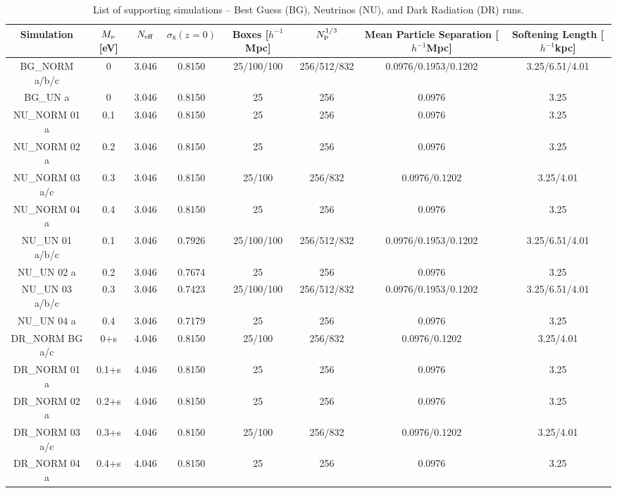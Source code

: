 \documentclass{emulateapj}
\begin{document}
\begin{table*}
\begin{center}
\tiny
\centering
\caption{List of supporting simulations -- Best Guess (BG), Neutrinos (NU), and Dark Radiation (DR) runs.}
\doublerulesep 2.0pt
\renewcommand\arraystretch{1.5}
\begin{tabular}{cccccccc} 
\hline \hline
 Simulation &   $M_{\rm \nu}$ [eV]  &   $N_{\rm eff}$ & $\sigma_8(z=0)$  & Boxes [$h^{-1}$Mpc] & $N_{\rm p}^{1/3}$ & Mean Particle Separation  [$h^{-1}$Mpc] & { Softening Length [$h^{-1}$kpc]}  \\ 
\hline
BG\_NORM  a/b/c & 0          &3.046 & 0.8150             &     25/100/100  & 256/512/832 & 0.0976/0.1953/0.1202 &  3.25/6.51/4.01 \\
BG\_UN  a & 0           &3.046  & 0.8150             &     25 & 256 & 0.0976 &  { 3.25}  \\
\hline
NU\_NORM 01  a & 0.1       &3.046 & 0.8150 & 25 & 256 & 0.0976 &  { 3.25 } \\
NU\_NORM 02  a & 0.2       &3.046 & 0.8150 & 25 & 256 & 0.0976 &  { 3.25 } \\
NU\_NORM 03  a/c & 0.3       &3.046 & 0.8150 & 25/100 & 256/832 &   0.0976/0.1202 & {3.25/4.01} \\
NU\_NORM 04  a & 0.4       &3.046 & 0.8150 & 25 & 256 & 0.0976 &  { 3.25} \\

NU\_UN 01  a/b/c & 0.1       &3.046 &  0.7926 & 25/100/100 & 256/512/832 & 0.0976/0.1953/0.1202 &  { 3.25/6.51/4.01} \\
NU\_UN 02  a       & 0.2       &3.046 & 0.7674 & 25 & 256  & 0.0976  &  { 3.25} \\
NU\_UN 03  a/b/c & 0.3       &3.046 & 0.7423 & 25/100/100 & 256/512/832 & 0.0976/0.1953/0.1202 &  { 3.25/6.51/4.01} \\
NU\_UN 04  a       & 0.4       &3.046 &  0.7179 & 25 & 256  & 0.0976  &  { 3.25} \\
\hline
DR\_NORM BG  a/c & 0+s       &4.046 & 0.8150 & 25/100 & 256/832 & 0.0976/0.1202 & {  3.25/4.01} \\
DR\_NORM 01  a & 0.1+s       &4.046& 0.8150 & 25 & 256 & 0.0976 &  { 3.25} \\
DR\_NORM 02  a & 0.2+s       &4.046& 0.8150 & 25 & 256 & 0.0976 &  { 3.25} \\
DR\_NORM 03  a/c & 0.3+s       &4.046& 0.8150 & 25/100 & 256/832 & 0.0976/0.1202  &  { 3.25/4.01} \\
DR\_NORM 04  a & 0.4+s       &4.046& 0.8150 & 25 & 256 & 0.0976 &  {3.25} \\


\end{tabular}
\end{center}
\end{table*}
\end{document}
